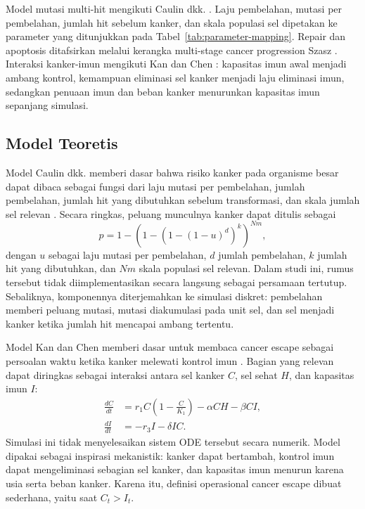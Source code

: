 Model mutasi multi-hit mengikuti Caulin dkk. \cite{caulin2015}. Laju
pembelahan, mutasi per pembelahan, jumlah hit sebelum kanker, dan skala populasi
sel dipetakan ke parameter yang ditunjukkan pada Tabel~\ref{tab:parameter-mapping}.
Repair dan apoptosis ditafsirkan melalui kerangka multi-stage cancer progression
Szasz \cite{szasz2024}. Interaksi kanker-imun mengikuti Kan dan Chen
\cite{kan2024}: kapasitas imun awal menjadi ambang kontrol, kemampuan eliminasi
sel kanker menjadi laju eliminasi imun, sedangkan penuaan imun dan beban kanker
menurunkan kapasitas imun sepanjang simulasi.

\subsection{Model Teoretis}

Model Caulin dkk. memberi dasar bahwa risiko kanker pada organisme besar dapat
dibaca sebagai fungsi dari laju mutasi per pembelahan, jumlah pembelahan,
jumlah hit yang dibutuhkan sebelum transformasi, dan skala jumlah sel relevan
\cite{caulin2015}. Secara ringkas, peluang munculnya kanker dapat ditulis
sebagai
\begin{equation}
    p = 1 - \left(1 - \left(1 - (1-u)^d\right)^k\right)^{Nm},
\end{equation}
dengan $u$ sebagai laju mutasi per pembelahan, $d$ jumlah pembelahan, $k$ jumlah
hit yang dibutuhkan, dan $Nm$ skala populasi sel relevan. Dalam studi ini,
rumus tersebut tidak diimplementasikan secara langsung sebagai persamaan
tertutup. Sebaliknya, komponennya diterjemahkan ke simulasi diskret: pembelahan
memberi peluang mutasi, mutasi diakumulasi pada unit sel, dan sel menjadi kanker
ketika jumlah hit mencapai ambang tertentu.

Model Kan dan Chen memberi dasar untuk membaca cancer escape sebagai persoalan
waktu ketika kanker melewati kontrol imun \cite{kan2024}. Bagian yang relevan
dapat diringkas sebagai interaksi antara sel kanker $C$, sel sehat $H$, dan
kapasitas imun $I$:
\begin{align}
    \frac{dC}{dt} &= r_1 C\left(1-\frac{C}{K_1}\right)-\alpha CH-\beta CI, \\
    \frac{dI}{dt} &= -r_3 I-\delta IC.
\end{align}
Simulasi ini tidak menyelesaikan sistem ODE tersebut secara numerik. Model
dipakai sebagai inspirasi mekanistik: kanker dapat bertambah, kontrol imun dapat
mengeliminasi sebagian sel kanker, dan kapasitas imun menurun karena usia serta
beban kanker. Karena itu, definisi operasional cancer escape dibuat sederhana,
yaitu saat $C_t>I_t$.

